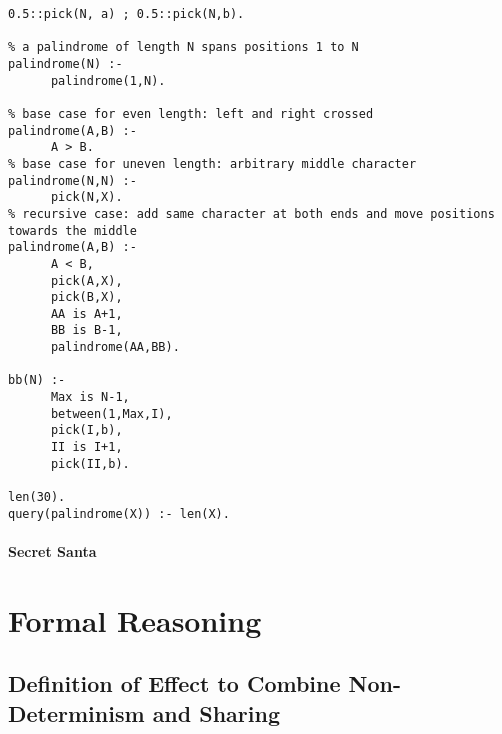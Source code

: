 \begin{verbatim}
0.5::pick(N, a) ; 0.5::pick(N,b).

% a palindrome of length N spans positions 1 to N
palindrome(N) :-
      palindrome(1,N).

% base case for even length: left and right crossed
palindrome(A,B) :-
      A > B.
% base case for uneven length: arbitrary middle character
palindrome(N,N) :-
      pick(N,X).
% recursive case: add same character at both ends and move positions towards the middle
palindrome(A,B) :-
      A < B,
      pick(A,X),
      pick(B,X),
      AA is A+1,
      BB is B-1,
      palindrome(AA,BB).

bb(N) :-
      Max is N-1,
      between(1,Max,I),
      pick(I,b),
      II is I+1,
      pick(II,b).

len(30).
query(palindrome(X)) :- len(X).
\end{verbatim}

\paragraph{Secret Santa}

\section{Formal Reasoning}

\subsection{Definition of Effect to Combine Non-Determinism and
  Sharing}
\label{subsec:appendix:NDSharing}

